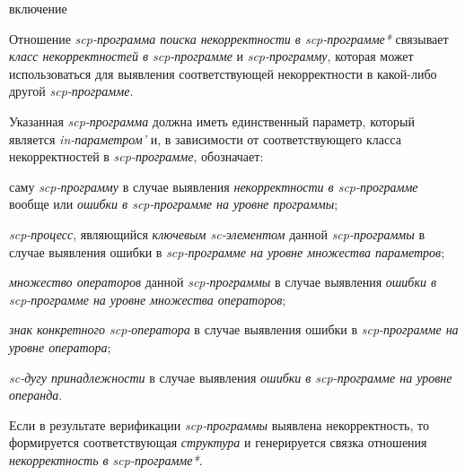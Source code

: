 \begin{SCn}
\begin{scnrelfromlist}{включение}
    \begin{scnindent}
    \end{scnindent}
\end{scnrelfromlist}

\end{SCn}

Отношение \textit{scp-программа поиска некорректности в scp-программе*} связывает \textit{класс некорректностей в scp-программе} и \textit{scp-программу}, которая может использоваться для выявления соответствующей некорректности в какой-либо другой \textit{scp-программе}. 

Указанная \textit{scp-программа} должна иметь единственный параметр, который является \textit{in-параметром’} и, в зависимости от соответствующего класса некорректностей в \textit{scp-программе}, обозначает:

\begin{textitemize}
    \item саму \textit{scp-программу} в случае выявления \textit{некорректности в scp-программе} вообще или \textit{ошибки в scp-программе на уровне программы};
    \item \textit{scp-процесс}, являющийся \textit{ключевым sc-элементом} данной \textit{scp-программы} в случае выявления ошибки в \textit{scp-программе на уровне множества параметров};
    \item \textit{множество операторов} данной \textit{scp-программы} в случае выявления \textit{ошибки в scp-программе на уровне множества операторов};
    \item \textit{знак конкретного scp-оператора} в случае выявления ошибки в \textit{scp-программе на уровне оператора};
    \item \textit{sc-дугу принадлежности} в случае выявления \textit{ошибки в scp-программе на уровне операнда}.
\end{textitemize}

Если в результате верификации \textit{scp-программы} выявлена некорректность, то формируется соответствующая \textit{структура} и генерируется связка отношения \textit{некорректность в scp-программе*}.

